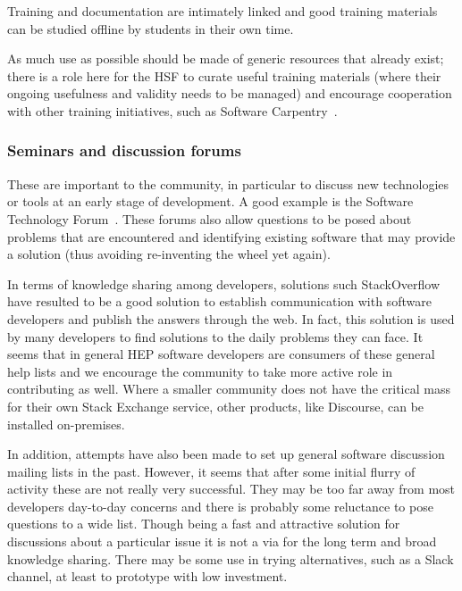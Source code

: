 \documentclass[12pt,a4paper]{article}
\begin{document}
Training and documentation are intimately linked and good training
materials can be studied offline by students in their own time.

As much use as possible should be made of generic resources that already
exist; there is a role here for the HSF to curate useful training
materials (where their ongoing usefulness and validity needs to be
managed) and encourage cooperation with other training initiatives, such
as Software Carpentry~\cite{SoftwareCarpentry}.

\hypertarget{seminars-and-discussion-forums}{%
\subsubsection{Seminars and discussion
forums}\label{seminars-and-discussion-forums}}

These are important to the community, in particular to discuss new
technologies or tools at an early stage of development. A good example
is the Software Technology
Forum~\cite{SoftwareTechForum}. These forums also allow questions to be posed
about problems that are encountered and identifying existing software that may provide
a solution (thus avoiding re-inventing the wheel yet again).

In terms of knowledge sharing among developers, solutions such
StackOverflow have resulted to be a good solution to establish
communication with software developers and publish the answers through
the web. In fact, this solution is used by many developers to find
solutions to the daily problems they can face. It seems that in general
HEP software developers are consumers of these general help lists and we
encourage the community to take more active role in contributing as
well. Where a smaller community does not have the critical mass for
their own Stack Exchange service, other products, like Discourse, can be
installed on-premises.

In addition, attempts have also been made to set up general software
discussion mailing lists in the past. However, it seems that after some
initial flurry of activity these are not really very successful. They
may be too far away from most developers day-to-day concerns and there
is probably some reluctance to pose questions to a wide list. Though
being a fast and attractive solution for discussions about a particular
issue it is not a via for the long term and broad knowledge sharing.
There may be some use in trying alternatives, such as a Slack channel,
at least to prototype with low investment.
\end{document}
